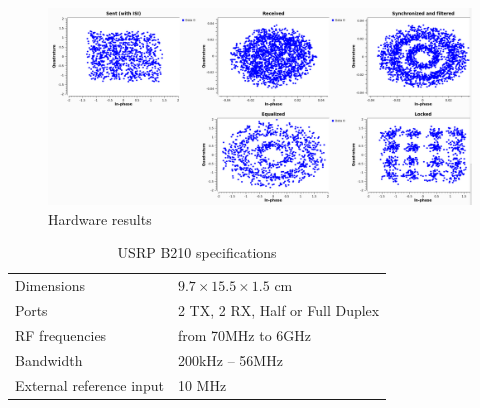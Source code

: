 \begin{figure}
	\includegraphics[width=\linewidth]{./figures/screenshots/QAM16_Hardware_1711.png}
	\caption{Hardware results}
	\label{fig:simul16QAM__Hardware}	
\end{figure}


\begin{table}[]
	\centering
	\caption{USRP B210 specifications}
	\begin{tabular}{ll}
		\toprule
		Dimensions               & \(9.7 \times 15.5 \times 1.5\) cm \\
		Ports                    & 2 TX, 2 RX, Half or Full Duplex     \\
		RF frequencies           & from 70MHz to 6GHz                    \\
		Bandwidth                & 200kHz -- 56MHz                       \\
		External reference input & 10 MHz                                \\
		\bottomrule
	\end{tabular}
\label{tab:USRP B210 specifications}
\end{table}
